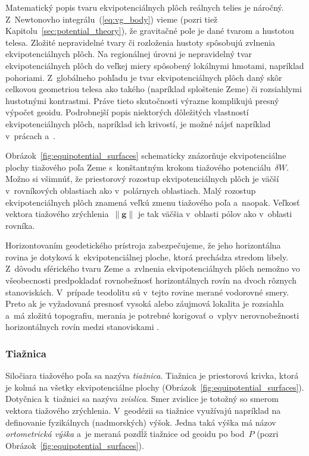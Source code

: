 \documentclass[a4paper,12pt]{book}
\let\vec\mathbf
\begin{document}
Matematický popis tvaru ekvipotenciálnych plôch reálnych telies je náročný.  
Z~Newtonovho integrálu~(\ref{eq:vg_body}) vieme (pozri tiež 
Kapitolu~\ref{sec:potential_theory}), že gravitačné pole je dané tvarom 
a hustotou telesa.  Zložité nepravidelné tvary či rozloženia hustoty spôsobujú 
zvlnenia ekvipotenciálnych plôch.  Na regionálnej úrovni je nepravidelný tvar 
ekvipotenciálnych plôch do veľkej miery spôsobený lokálnymi hmotami, napríklad 
pohoriami.  Z~globálneho pohľadu je tvar ekvipotenciálnych plôch daný skôr 
celkovou geometriou telesa ako takého (napríklad sploštenie Zeme) či 
rozsiahlymi hustotnými kontrastmi.  Práve tieto skutočnosti výrazne komplikujú 
presný výpočet geoidu.  Podrobnejší popis niektorých dôležitých vlastností 
ekvipotenciálnych plôch, napríklad ich krivostí, je možné nájsť napríklad 
v~prácach \textcite{Janak2006} a~\textcite{MoritzPhysicalGeodesy}.

Obrázok~\ref{fig:equipotential_surfaces} schematicky znázorňuje ekvipotenciálne
plochy tiažového poľa Zeme s~konštantným krokom tiažového potenciálu~$\delta
W$.  Možno si všimnúť, že priestorový rozostup ekvipotenciálnych plôch je väčší
v~rovníkových oblastiach ako v~polárnych oblastiach.  Malý rozostup
ekvipotenciálnych plôch znamená veľkú zmenu tiažového poľa a~naopak.  Veľkosť
vektora tiažového zrýchlenia~$\| \vec g \|$ je tak väčšia v~oblasti pólov ako
v~oblasti rovníka.

Horizontovaním geodetického prístroja zabezpečujeme, že jeho horizontálna
rovina je dotyková k~ekvipotenciálnej ploche, ktorá prechádza stredom libely.
Z~dôvodu sférického tvaru Zeme a~zvlnenia ekvipotenciálnych plôch nemožno vo
všeobecnosti predpokladať rovnobežnosť horizontálnych rovín na dvoch rôznych
stanoviskách.  V~prípade teodolitu sú v~tejto rovine merané vodorovné smery.
Preto ak je vyžadovaná presnosť vysoká alebo záujmová lokalita je rozsiahla
a~má zložitú topografiu,  merania je potrebné korigovať o~vplyv nerovnobežnosti
horizontálnych rovín medzi stanoviskami \parencite[pozri 
napríklad][]{VanicekGeodesy}.

\subsubsection{Tiažnica}

Siločiara tiažového poľa sa nazýva \emph{tiažnica}.  Tiažnica je priestorová 
krivka, ktorá je kolmá na všetky ekvipotenciálne plochy 
(Obrázok~\ref{fig:equipotential_surfaces}).  Dotyčnica k~tiažnici sa nazýva 
\emph{zvislica}.  Smer zvislice je totožný so smerom vektora tiažového 
zrýchlenia.  V~geodézii sa tiažnice využívajú napríklad na definovanie 
fyzikálnych (nadmorských) výšok.  Jedna taká výška má názov \emph{ortometrická 
výška} a~je meraná pozdĺž tiažnice od geoidu po bod~$P$ (pozri 
Obrázok~\ref{fig:equipotential_surfaces}).
\end{document}
